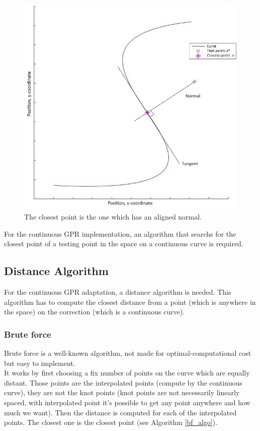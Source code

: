 \begin{figure}[H]
\centering
\includegraphics[width=13cm]{img/normal.jpg}
\caption{The closest point is the one which has an aligned normal.}
\label{normal_curve}
\end{figure}


For the continuous GPR implementation, an algorithm that searchs for the closest point of a testing point in the space on a continuous curve is required.

\clearpage
\subsection{Distance Algorithm}

For the continuous GPR adaptation, a distance algorithm is needed. This algorithm has to compute the closest distance from a point (which is anywhere in the space) on the correction (which is a continuous curve).

\subsubsection{Brute force}

Brute force is a well-known algorithm, not made for optimal-computational cost but easy to implement.\\
It works by first choosing a fix number of points on the curve which are equally distant. Those points are the interpolated points (compute by the continuous curve), they are not the knot points (knot points are not necessarily linearly spaced, with interpolated point it's possible to get any point anywhere and how much we want). Then the distance is computed for each of the interpolated points. The closest one is the closest point (see Algorithm \autoref{bf_algo}).

